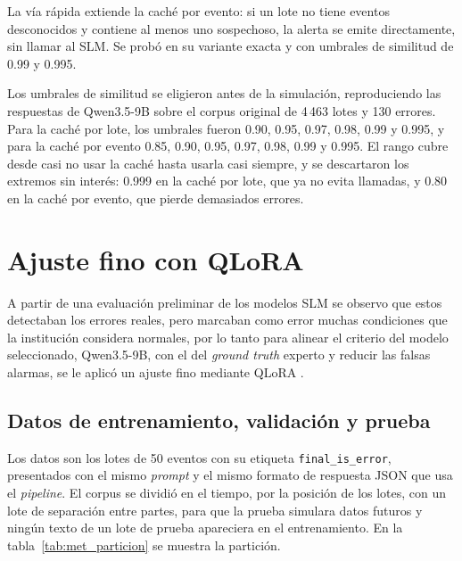 

La vía rápida extiende la caché por evento: si un lote no tiene eventos desconocidos y contiene al menos uno sospechoso, la alerta se emite directamente, sin llamar al SLM. Se probó en su variante exacta y con umbrales de similitud de 0.99 y 0.995.


Los umbrales de similitud se eligieron antes de la simulación, reproduciendo las respuestas de Qwen3.5-9B sobre el corpus original de 4\,463 lotes y 130 errores. Para la caché por lote, los umbrales fueron 0.90, 0.95, 0.97, 0.98, 0.99 y 0.995, y para la caché por evento 0.85, 0.90, 0.95, 0.97, 0.98, 0.99 y 0.995. El rango cubre desde casi no usar la caché hasta usarla casi siempre, y se descartaron los extremos sin interés: 0.999 en la caché por lote, que ya no evita llamadas, y 0.80 en la caché por evento, que pierde demasiados errores.

\section{Ajuste fino con QLoRA}\label{sec:met_finetuning}

A partir de una evaluación preliminar de los modelos SLM se observo que estos detectaban los errores reales, pero marcaban como error muchas condiciones que la institución considera normales, por lo tanto para alinear el criterio del modelo seleccionado, Qwen3.5-9B, con el del \textit{ground truth} experto y reducir las falsas alarmas, se le aplicó un ajuste fino mediante QLoRA \cite{dettmers2023_qlora}.

\subsection{Datos de entrenamiento, validación y prueba}

Los datos son los lotes de 50 eventos con su etiqueta \texttt{final\_is\_error}, presentados con el mismo \textit{prompt} y el mismo formato de respuesta JSON que usa el \textit{pipeline}. El corpus se dividió en el tiempo, por la posición de los lotes, con un lote de separación entre partes, para que la prueba simulara datos futuros y ningún texto de un lote de prueba apareciera en el entrenamiento. En la tabla~\ref{tab:met_particion} se muestra la partición.


